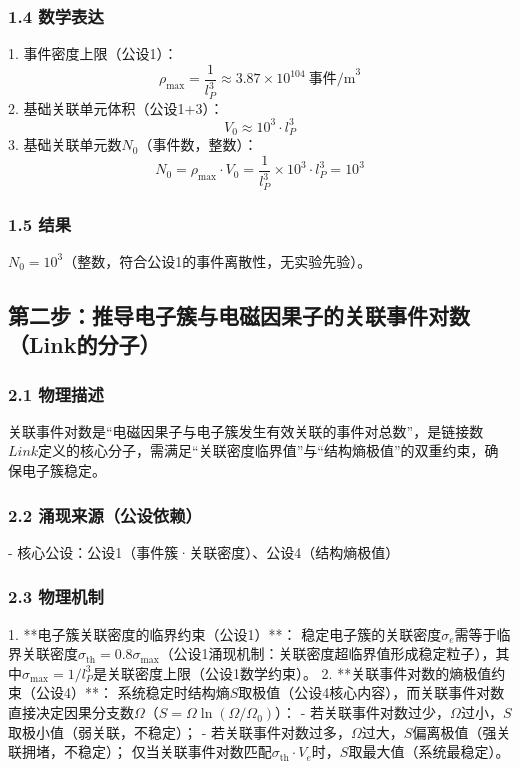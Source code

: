 \documentclass{article}
\begin{document}
\subsubsection{1.4 数学表达}
1. 事件密度上限（公设1）：  
   \[
   \rho_{\text{max}} = \frac{1}{l_P^3} \approx 3.87 \times 10^{104}\ \text{事件/m}^3
   \]
2. 基础关联单元体积（公设1+3）：  
   \[
   V_0 \approx 10^3 \cdot l_P^3
   \]
3. 基础关联单元数\(N_0\)（事件数，整数）：  
   \[
   N_0 = \rho_{\text{max}} \cdot V_0 = \frac{1}{l_P^3} \times 10^3 \cdot l_P^3 = 10^3
   \]

\subsubsection{1.5 结果}
\(N_0 = 10^3\)（整数，符合公设1的事件离散性，无实验先验）。


\subsection{第二步：推导电子簇与电磁因果子的关联事件对数（Link的分子）}
\subsubsection{2.1 物理描述}
关联事件对数是“电磁因果子与电子簇发生有效关联的事件对总数”，是链接数\(Link\)定义的核心分子，需满足“关联密度临界值”与“结构熵极值”的双重约束，确保电子簇稳定。

\subsubsection{2.2 涌现来源（公设依赖）}
- 核心公设：公设1（事件簇·关联密度）、公设4（结构熵极值）

\subsubsection{2.3 物理机制}
1. **电子簇关联密度的临界约束（公设1）**：  
   稳定电子簇的关联密度\(\sigma_e\)需等于临界关联密度\(\sigma_{\text{th}} = 0.8\sigma_{\text{max}}\)（公设1涌现机制：关联密度超临界值形成稳定粒子），其中\(\sigma_{\text{max}} = 1/l_P^3\)是关联密度上限（公设1数学约束）。
2. **关联事件对数的熵极值约束（公设4）**：  
   系统稳定时结构熵\(S\)取极值（公设4核心内容），而关联事件对数直接决定因果分支数\(\Omega\)（\(S = \Omega \ln(\Omega/\Omega_0)\)）：  
   - 若关联事件对数过少，\(\Omega\)过小，\(S\)取极小值（弱关联，不稳定）；  
   - 若关联事件对数过多，\(\Omega\)过大，\(S\)偏离极值（强关联拥堵，不稳定）；  
   仅当关联事件对数匹配\(\sigma_{\text{th}} \cdot V_e\)时，\(S\)取最大值（系统最稳定）。
\end{document}
